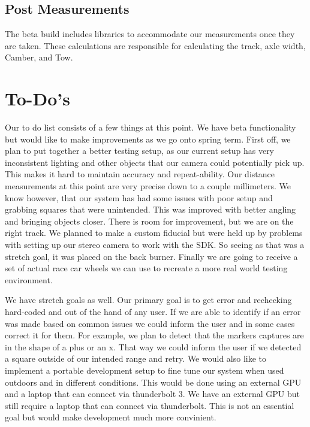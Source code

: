 \documentclass[onecolumn, draftclsnofoot,10pt, compsoc]{IEEEtran}
\begin{document}
\subsection{Post Measurements}
The beta build includes libraries to accommodate our measurements once they are taken.  These calculations are responsible for calculating the track, axle width, Camber, and Tow.  


\section{To-Do's}
Our to do list consists of a few things at this point. We have beta functionality but would like to make improvements as we go onto spring term. First off, we plan to put together a better testing setup, as our current setup has very inconsistent lighting and other objects that our camera could potentially pick up. This makes it hard to maintain accuracy and repeat-ability. Our distance measurements at this point are very precise down to a couple millimeters. We know however, that our system has had some issues with poor setup and grabbing squares that were unintended. This was improved with better angling and bringing objects closer. There is room for improvement, but we are on the right track. We planned to make a custom fiducial but were held up by problems with setting up our stereo camera to work with the SDK. So seeing as that was a stretch goal, it was placed on the back burner. Finally we are going to receive a set of actual race car wheels we can use to recreate a more real world testing environment.

We have stretch goals as well. Our primary goal is to get error and rechecking hard-coded and out of the hand of any user. If we are able to identify if an error was made based on common issues we could inform the user and in some cases correct it for them. For example, we plan to detect that the markers captures are in the shape of a plus or an x. That way we could inform the user if we detected a square outside of our intended range and retry. We would also like to implement a portable development setup to fine tune our system when used outdoors and in different conditions. This would be done using an external GPU and a laptop that can connect via thunderbolt 3. We have an external GPU but still require a laptop that can connect via thunderbolt. This is not an essential goal but would make development much more convinient. 
\end{document}
